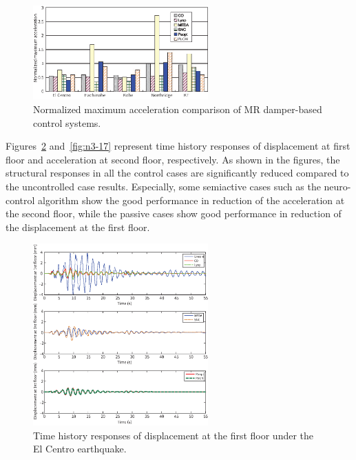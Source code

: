 \begin{figure}[!ht]
\centering
\includegraphics[width=0.6\textwidth] {figure/n3-15.eps}
\caption{Normalized maximum acceleration comparison of MR damper-based control systems.}
\label{fig:n3-15}
\end{figure}

Figures~\ref{fig:n3-16} and~\ref{fig:n3-17} represent time history responses of displacement at first floor and acceleration at second floor, respectively. As shown in the figures, the structural responses in all the control cases are significantly reduced compared to the uncontrolled case results. Especially, some semiactive cases such as the neuro-control algorithm show the good performance in reduction of the acceleration at the second floor, while the passive cases show good performance in reduction of the displacement at the first floor.

\begin{figure}[!ht]
\centering
\includegraphics[width=0.6\textwidth] {figure/n3-16.eps}
\caption{Time history responses of displacement at the first floor under the El Centro earthquake.}
\label{fig:n3-16}
\end{figure}

